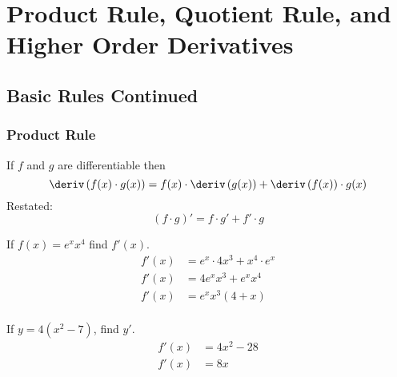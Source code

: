 
\section{Product Rule, Quotient Rule, and Higher Order Derivatives}
\subsection{Basic Rules Continued}
\subsubsection{Product Rule}
\begin{theorem}
    If $f$ and $g$ are differentiable then
    \begin{equation}
        \deriv\left(f(x) \cdot g(x)\right) = f(x) \cdot \deriv \left(g(x)\right) + \deriv \left(f(x)\right) \cdot g(x)
    \end{equation}
    Restated:
    \begin{equation}
        \left(f \cdot g\right)' = f \cdot g' + f' \cdot g
    \end{equation}
\end{theorem}
\begin{example}
    If $f(x) = e^xx^4$ find $f'(x)$.
    \begin{align*}
        f'(x) &= e^x \cdot 4x^3 + x^4 \cdot e^x \\
        f'(x) &= 4e^xx^3 + e^xx^4 \\
        f'(x) &= e^xx^3(4 + x) \\
    \end{align*}
\end{example}
\begin{example}
    If $y=4(x^2 - 7)$, find $y'$.
    \begin{align*}
        f'(x) &= 4x^2 - 28 \\
        f'(x) &= 8x
    \end{align*}
\end{example}
